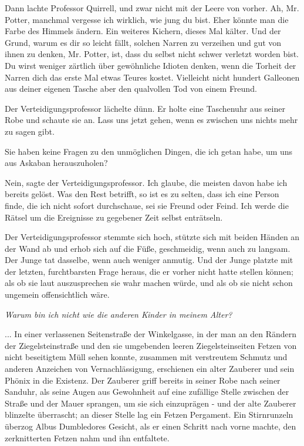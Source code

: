 Dann lachte Professor Quirrell, und zwar nicht mit der Leere von vorher. \glqq{}
Ah, Mr. Potter, manchmal vergesse ich wirklich, wie jung du bist. Eher könnte
man die Farbe des Himmels ändern.\grqq{} Ein weiteres Kichern, dieses Mal
kälter. \glqq{}Und der Grund, warum es dir so leicht fällt, solchen Narren zu
verzeihen und gut von ihnen zu denken, Mr. Potter, ist, dass du selbst nicht
schwer verletzt worden bist. Du wirst weniger zärtlich über gewöhnliche Idioten
denken, wenn die Torheit der Narren dich das erste Mal etwas Teures kostet.
Vielleicht nicht hundert Galleonen aus deiner eigenen Tasche aber den qualvollen
Tod von einem Freund.\grqq{}

Der Verteidigungsprofessor lächelte dünn. Er holte eine Taschenuhr aus seiner
Robe und schaute sie an. \glqq{}Lass uns jetzt gehen, wenn es zwischen uns nichts
mehr zu sagen gibt.\grqq{}

\glqq{}Sie haben keine Fragen zu den unmöglichen Dingen, die ich getan habe, um
uns aus Askaban herauszuholen?\grqq{}

\glqq{}Nein\grqq{}, sagte der Verteidigungsprofessor. \glqq{}Ich glaube, die
meisten davon habe ich bereits gelöst. Was den Rest betrifft, so ist es zu
selten, dass ich eine Person finde, die ich nicht sofort durchschaue, sei sie
Freund oder Feind. Ich werde die Rätsel um die Ereignisse zu gegebener Zeit
selbst enträtseln.\grqq{}

Der Verteidigungsprofessor stemmte sich hoch, stützte sich mit beiden Händen an
der Wand ab und erhob sich auf die Füße, geschmeidig, wenn auch zu langsam. Der
Junge tat dasselbe, wenn auch weniger anmutig. Und der Junge platzte mit der
letzten, furchtbarsten Frage heraus, die er vorher nicht hatte stellen können;
als ob sie laut auszusprechen sie wahr machen würde, und als ob sie nicht schon
ungemein offensichtlich wäre.

\emph{\glqq{}Warum bin ich nicht wie die
anderen Kinder in meinem Alter?\grqq{}}

... In einer verlassenen Seitenstraße der Winkelgasse, in der man an den Rändern
der Ziegelsteinstraße und den sie umgebenden leeren Ziegelsteinseiten Fetzen von
nicht beseitigtem Müll sehen konnte, zusammen mit verstreutem Schmutz und
anderen Anzeichen von Vernachlässigung, erschienen ein alter Zauberer und sein
Phönix in die Existenz. Der Zauberer griff bereits in seiner Robe nach seiner
Sanduhr, als seine Augen aus Gewohnheit auf eine zufällige Stelle zwischen der
Straße und der Mauer sprangen, um sie sich einzuprägen - und der alte Zauberer
blinzelte überrascht; an dieser Stelle lag ein Fetzen Pergament. Ein
Stirnrunzeln überzog Albus Dumbledores Gesicht, als er einen Schritt nach vorne
machte, den zerknitterten Fetzen nahm und ihn entfaltete.

